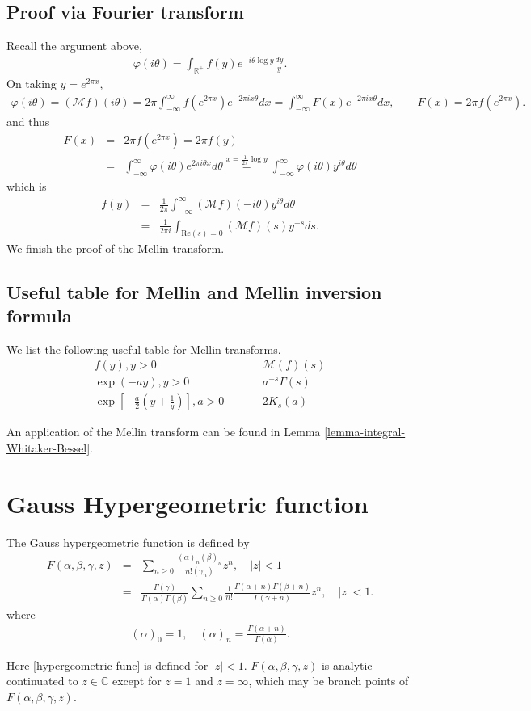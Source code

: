\documentclass[11pt,reqno]{amsart}
\newcommand{\bea}{\begin{eqnarray}}
\newcommand{\eea}{\end{eqnarray}}
\newcommand{\bna}{\begin{eqnarray*}}
\newcommand{\ena}{\end{eqnarray*}}
\def\re{{\mathrm{Re}}}
\def\C{\mathbb{C}}
\def\R{\mathbb{R}}
\theoremstyle{definition}
\begin{document}
\subsection{Proof via Fourier transform}
Recall the argument above,
\bna
\varphi(i\theta)=\int_{\R^+}f(y)e^{-i\theta\log y}\frac{dy}{y}.
\ena
On taking $y=e^{2\pi x}$,
\bna
\varphi(i\theta)=(\mathcal Mf)(i\theta)=
2\pi\int_{-\infty}^\infty f(e^{2\pi x})e^{-2\pi i x\theta}dx=\int_{-\infty}^\infty
F(x)e^{-2\pi i x\theta}dx,\qquad F(x)=2\pi f(e^{2\pi x}).
\ena
and thus
\bna
F(x)&=&2\pi f(e^{2\pi x})=2\pi f(y)\\
&=&\int_{-\infty}^\infty \varphi(i\theta) e^{2\pi i\theta x}d\theta
\overset{x=\frac{1}{2\pi}\log y}{=}
\int_{-\infty}^\infty \varphi(i\theta) y^{i\theta }d\theta
\ena
which is
\bna
f(y)&=&\frac{1}{2\pi}\int_{-\infty}^{\infty}(\mathcal Mf)(-i\theta)y^{i\theta}d\theta\\
&=&\frac{1}{2\pi i}\int_{\re(s)=0}(\mathcal Mf)(s)y^{-s}ds.
\ena
We finish the proof of the Mellin transform.
\subsection{Useful table for Mellin and Mellin inversion formula}\label{subsec-useful-Mellin-transform}
We list the following useful table for Mellin transforms.
\begin{align*}
f(y),y>0&\quad &&\mathcal M(f)(s)\\
\exp(-ay),y>0&\quad &&a^{-s}\Gamma(s)\\
\exp\left[-\frac{a}{2}(y+\frac{1}{y})\right],a>0&\quad
&&2K_s(a)
\end{align*}

An application of the Mellin transform can be found in Lemma \ref{lemma-integral-Whitaker-Bessel}.

\section{Gauss Hypergeometric function}
The Gauss hypergeometric function is defined by
\bea
F(\alpha,\beta,\gamma,z)&=&\sum_{ n\geq 0}\frac{(\alpha)_n(\beta)_n}{n!(\gamma_n)} z^n,\quad |z|<1
\nonumber\\
&=&\frac{\Gamma(\gamma)}{\Gamma(\alpha)\Gamma(\beta)}\sum_{n\geq 0}\frac{1}{n!}
\frac{\Gamma(\alpha+n)\Gamma(\beta+n)}{\Gamma(\gamma+n)} z^n,\quad |z|<1.
\label{hypergeometric-func}
\eea
where
\bna
(\alpha)_0=1,\quad (\alpha)_n=\frac{\Gamma(\alpha+n)}{\Gamma(\alpha)}.
\ena

Here \eqref{hypergeometric-func} is defined for $|z|<1$. $F(\alpha,\beta,\gamma,z)$
is analytic continuated to $z\in\C$ except for $z=1$ and $z=\infty$,
which may be branch points of $F(\alpha,\beta,\gamma,z)$.
\end{document}
